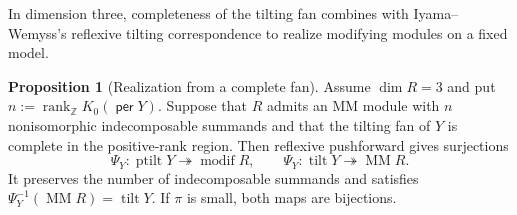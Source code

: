 \documentclass[a4paper,reqno]{amsart}
\DeclareMathOperator{\per}{\mathsf{per}}
\DeclareMathOperator{\tilt}{tilt}
\DeclareMathOperator{\ptilt}{ptilt}
\DeclareMathOperator{\modif}{modif}
\DeclareMathOperator{\MM}{MM}
\theoremstyle{definition}
\newtheorem{Prop}[Thm]{Proposition}
\begin{document}
In dimension three, completeness of the tilting fan combines with Iyama--Wemyss's reflexive tilting correspondence to realize modifying modules on a fixed model.

\begin{Prop}[Realization from a complete fan]\label{prop:complete-fan-realization}
Assume $\dim R=3$ and put $n:=\operatorname{rank}_{\mathbb Z}K_0(\per Y)$. Suppose that $R$ admits an MM module with $n$ nonisomorphic indecomposable summands and that the tilting fan of $Y$ is complete in the positive-rank region. Then reflexive pushforward gives surjections
\begin{equation}\label{eq:complete-fan-pushforward}
\Psi_Y\colon\ptilt Y\twoheadrightarrow\modif R,
\qquad
\Psi_Y\colon\tilt Y\twoheadrightarrow\MM R.
\end{equation}
It preserves the number of indecomposable summands and satisfies $\Psi_Y^{-1}(\MM R)=\tilt Y$. If $\pi$ is small, both maps are bijections.
\end{Prop}
\end{document}
